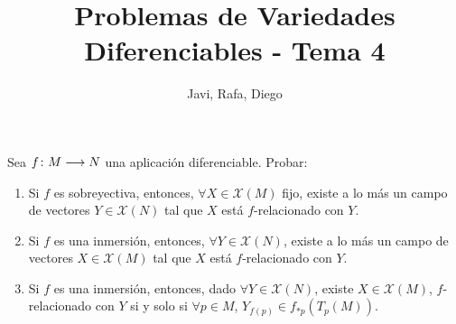 \documentclass[twoside]{article}
\begin{document}
\title{Problemas de Variedades Diferenciables - Tema 4}
\author{Javi, Rafa, Diego}
\maketitle



\begin{ejercicio}{7}
Sea $f\colon{M}\longrightarrow{N}$ una aplicación diferenciable. Probar:
\begin{enumerate}
\item Si $f$ es sobreyectiva, entonces, $\forall X \in \mathcal{X}(M)$ fijo, existe a lo más un campo de vectores $Y\in \mathcal{X}(N)$ tal que $X$ está $f$-relacionado con $Y$. 
\item Si $f$ es una inmersión, entonces, $\forall Y \in \mathcal{X}(N)$, existe a lo más un campo de vectores $X\in \mathcal{X}(M)$ tal que $X$ está $f$-relacionado con $Y$. 
\item Si $f$ es una inmersión, entonces, dado $\forall Y \in \mathcal{X}(N)$, existe $X\in \mathcal{X}(M)$, $f$-relacionado con $Y$ si y solo si $\forall p \in M$, $Y_{f(p)}\in f_{\ast p}(T_p(M))$.
\end{enumerate}
\end{ejercicio}
\begin{solucion}
\end{solucion}
\end{document}
